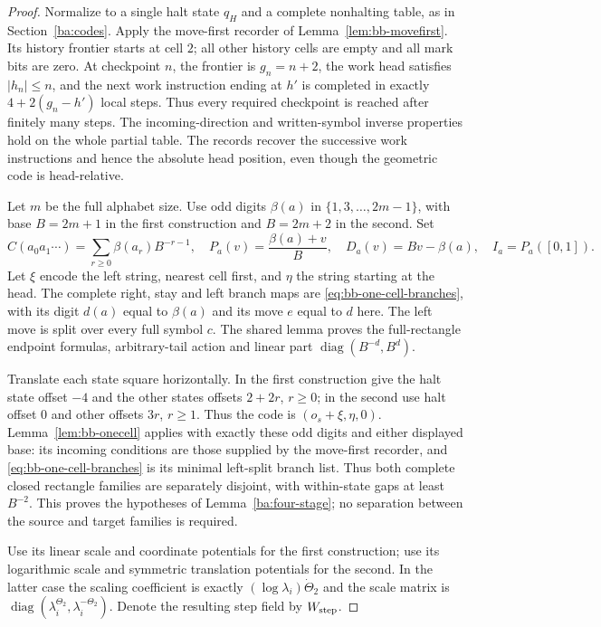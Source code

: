 \begin{proof}\label{ba:bounded-box-tests-proof}
Normalize to a single halt state $q_H$ and a complete nonhalting table,
as in Section~\ref{ba:codes}.  Apply the move-first recorder of
Lemma~\ref{lem:bb-movefirst}.  Its history frontier starts at cell $2$;
all other history cells are empty and all mark bits are zero.  At
checkpoint $n$, the frontier is $g_n=n+2$, the work head satisfies
$|h_n|\le n$, and the next work instruction ending at $h'$ is completed
in exactly $4+2(g_n-h')$ local steps.  Thus every required checkpoint
is reached after finitely many steps.  The incoming-direction and
written-symbol inverse properties hold on the whole partial table.
The records recover the successive work instructions and hence the
absolute head position, even though the geometric code is head-relative.

Let $m$ be the full alphabet size.  Use odd digits $\beta(a)$ in
$\{1,3,\ldots,2m-1\}$, with base $B=2m+1$ in the first construction
and $B=2m+2$ in the second.  Set
\[
 C(a_0a_1\cdots)=\sum_{r\ge0}\beta(a_r)B^{-r-1},\quad
 P_a(v)=\frac{\beta(a)+v}{B},\quad D_a(v)=Bv-\beta(a),\quad
 I_a=P_a([0,1]).
\]
Let $\xi$ encode the left string, nearest cell first, and $\eta$
the string starting at the head.  The complete right, stay and left
branch maps are \eqref{eq:bb-one-cell-branches}, with its digit
$d(a)$ equal to $\beta(a)$ and its move $e$ equal to $d$ here.
The left move is split over every full symbol $c$.  The shared lemma
proves the full-rectangle endpoint formulas, arbitrary-tail action and
linear part $\operatorname{diag}(B^{-d},B^d)$.

Translate each state square horizontally.  In the first construction
give the halt state offset $-4$ and the other states offsets $2+2r$,
$r\ge0$; in the second use halt offset $0$ and other offsets $3r$,
$r\ge1$.  Thus the code is $(o_s+\xi,\eta,0)$.
Lemma~\ref{lem:bb-onecell} applies with exactly these odd digits and
either displayed base: its incoming conditions are those supplied by
the move-first recorder, and \eqref{eq:bb-one-cell-branches} is its minimal
left-split branch list.  Thus both complete closed rectangle families
are separately disjoint, with within-state gaps at least $B^{-2}$.
This proves the hypotheses of Lemma~\ref{ba:four-stage}; no separation
between the source and target families is required.

Use its linear scale and coordinate potentials for the first construction;
use its logarithmic scale and symmetric translation potentials for the
second.  In the latter case the scaling coefficient is exactly
$(\log\lambda_i)\dot\Theta_2$ and the scale matrix is
$\operatorname{diag}(\lambda_i^{\Theta_2},\lambda_i^{-\Theta_2})$.
Denote the resulting step field by $W_{\rm step}$.


\end{proof}
